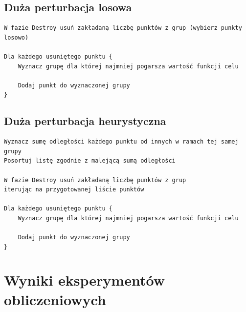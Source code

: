 \documentclass[main.tex]{subfiles}
\begin{document}
\subsection{Duża perturbacja losowa}
\begin{verbatim}
W fazie Destroy usuń zakładaną liczbę punktów z grup (wybierz punkty losowo)

Dla każdego usuniętego punktu {
    Wyznacz grupę dla której najmniej pogarsza wartość funkcji celu

    Dodaj punkt do wyznaczonej grupy
}
\end{verbatim}

\subsection{Duża perturbacja heurystyczna}
\begin{verbatim}
Wyznacz sumę odległości każdego punktu od innych w ramach tej samej grupy
Posortuj listę zgodnie z malejącą sumą odległości

W fazie Destroy usuń zakładaną liczbę punktów z grup
iterując na przygotowanej liście punktów

Dla każdego usuniętego punktu {
    Wyznacz grupę dla której najmniej pogarsza wartość funkcji celu

    Dodaj punkt do wyznaczonej grupy
}
\end{verbatim}

\section{Wyniki eksperymentów obliczeniowych}
\label{section:wyniki}
\end{document}

